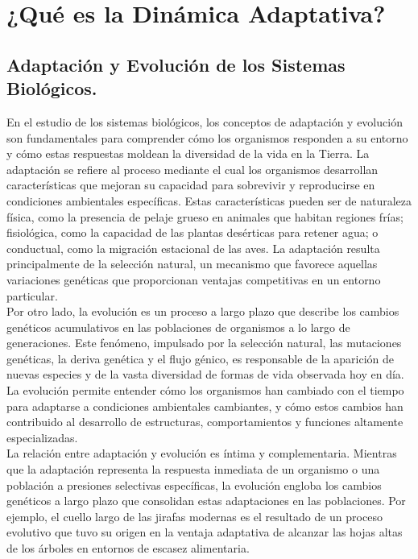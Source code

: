 \section{¿Qué es la Dinámica Adaptativa?}{

        \subsection{Adaptación y Evolución de los Sistemas Biológicos.}{

            \normalsize{En el estudio de los sistemas biológicos, los conceptos de adaptación y evolución son fundamentales para comprender cómo los organismos responden a su entorno y cómo estas respuestas moldean la diversidad de la vida en la Tierra. \citep{adaptacion} La adaptación se refiere al proceso mediante el cual los organismos desarrollan características que mejoran su capacidad para sobrevivir y reproducirse en condiciones ambientales específicas. Estas características pueden ser de naturaleza física, como la presencia de pelaje grueso en animales que habitan regiones frías; fisiológica, como la capacidad de las plantas desérticas para retener agua; o conductual, como la migración estacional de las aves. La adaptación resulta principalmente de la selección natural, un mecanismo que favorece aquellas variaciones genéticas que proporcionan ventajas competitivas en un entorno particular.}\\

            \normalsize{\citep {evolucion} Por otro lado, la evolución es un proceso a largo plazo que describe los cambios genéticos acumulativos en las poblaciones de organismos a lo largo de generaciones. Este fenómeno, impulsado por la selección natural, las mutaciones genéticas, la deriva genética y el flujo génico, es responsable de la aparición de nuevas especies y de la vasta diversidad de formas de vida observada hoy en día. La evolución permite entender cómo los organismos han cambiado con el tiempo para adaptarse a condiciones ambientales cambiantes, y cómo estos cambios han contribuido al desarrollo de estructuras, comportamientos y funciones altamente especializadas.}\\

            \normalsize{La relación entre adaptación y evolución es íntima y complementaria. Mientras que la adaptación representa la respuesta inmediata de un organismo o una población a presiones selectivas específicas, la evolución engloba los cambios genéticos a largo plazo que consolidan estas adaptaciones en las poblaciones. Por ejemplo, el cuello largo de las jirafas modernas es el resultado de un proceso evolutivo que tuvo su origen en la ventaja adaptativa de alcanzar las hojas altas de los árboles en entornos de escasez alimentaria.}\\

}}

